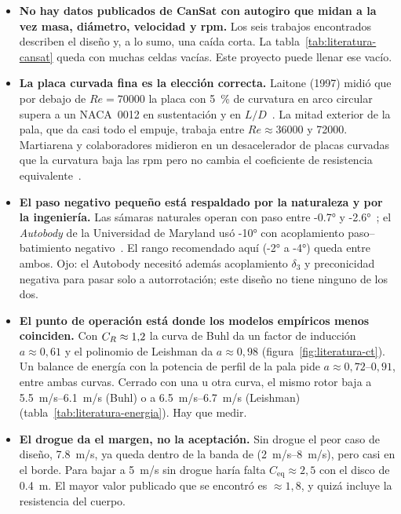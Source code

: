 \begin{resultado}
\begin{itemize}[leftmargin=*]
  \item \textbf{No hay datos publicados de CanSat con autogiro que midan a la vez masa,
        diámetro, velocidad y rpm.} Los seis trabajos encontrados describen el diseño y,
        a lo sumo, una caída corta. La tabla~\ref{tab:literatura-cansat} queda con muchas
        celdas vacías. Este proyecto puede llenar ese vacío.
  \item \textbf{La placa curvada fina es la elección correcta.} Laitone (1997) midió que
        por debajo de $Re=\num{70000}$ la placa con \SI{5}{\percent} de curvatura en arco
        circular supera a un NACA~0012 en sustentación y en
        $L/D$~\cite{literatura-laitone1997}. La mitad exterior de la pala, que da casi todo
        el empuje, trabaja entre $Re\approx\num{36000}$ y \num{72000}. Martiarena y
        colaboradores midieron en un desacelerador de placas curvadas que la curvatura baja
        las rpm pero no cambia el coeficiente de resistencia
        equivalente~\cite{literatura-martiarena2015}.
  \item \textbf{El paso negativo pequeño está respaldado por la naturaleza y por la
        ingeniería.} Las sámaras naturales operan con paso entre \ang{-0.7} y
        \ang{-2.6}~\cite{literatura-jung2024}; el \emph{Autobody} de la Universidad de
        Maryland usó \ang{-10} con acoplamiento paso--batimiento
        negativo~\cite{literatura-brindejonc2007}. El rango recomendado aquí
        (\ang{-2} a \ang{-4}) queda entre ambos. Ojo: el Autobody necesitó además
        acoplamiento $\delta_3$ y preconicidad negativa para pasar solo a autorrotación;
        este diseño no tiene ninguno de los dos.
  \item \textbf{El punto de operación está donde los modelos empíricos menos coinciden.}
        Con $C_{R}\approx1{,}2$ la curva de Buhl da un factor de inducción $a\approx0{,}61$
        y el polinomio de Leishman da $a\approx0{,}98$
        (figura~\ref{fig:literatura-ct}). Un balance de energía con la potencia de perfil
        de la pala pide $a\approx0{,}72$--$0{,}91$, entre ambas curvas. Cerrado con una u
        otra curva, el mismo rotor baja a \SIrange{5.5}{6.1}{m/s} (Buhl) o a
        \SIrange{6.5}{6.7}{m/s} (Leishman) (tabla~\ref{tab:literatura-energia}). Hay
        que medir.
  \item \textbf{El drogue da el margen, no la aceptación.} Sin drogue el peor caso de
        diseño, \SI{7.8}{m/s}, ya queda dentro de la banda de 
        (\SIrange{2}{8}{m/s}), pero casi en el borde. Para bajar a \SI{5}{m/s} sin drogue
        haría falta $C_{\mathrm{eq}}\approx2{,}5$ con el disco de \SI{0.4}{m}. El mayor
        valor publicado que se encontró es $\approx1{,}8$, y quizá incluye la resistencia
        del cuerpo.
\end{itemize}
\end{resultado}

